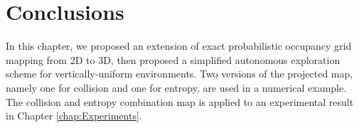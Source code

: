 

\section{Conclusions}

In this chapter, we proposed an extension of exact probabilistic occupancy grid mapping from 2D to 3D, then proposed a simplified autonomous exploration scheme for vertically-uniform environments. Two versions of the projected map, namely one for collision and one for entropy, are used in a numerical example. The collision and entropy combination map is applied to an experimental result in Chapter \ref{chap:Experiments}.



